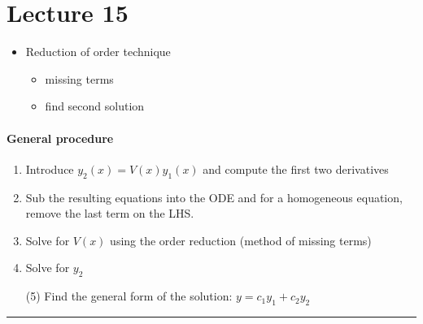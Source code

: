 \chapter*{Lecture 15}
\begin{recall}{}{}
\begin{itemize}
\item Reduction of order technique
\begin{itemize}
\item missing terms
\item find second solution
\end{itemize}
\end{itemize}
\end{recall}


\subsubsection*{General procedure}
\begin{enumerate}
\item Introduce $y_2(x)=V(x)y_1(x)$ and compute the first two derivatives
\item Sub the resulting equations into the ODE and for a homogeneous equation, remove the last term on the LHS.
\item Solve for $V(x)$ using the order reduction (method of missing terms)
\item Solve for $y_2$
\item[(5)]Find the general form of the solution: $y=c_1 y_1+c_2y_2$
\end{enumerate}


\begin{center}
\noindent\rule{4cm}{0.4pt}
\end{center}

